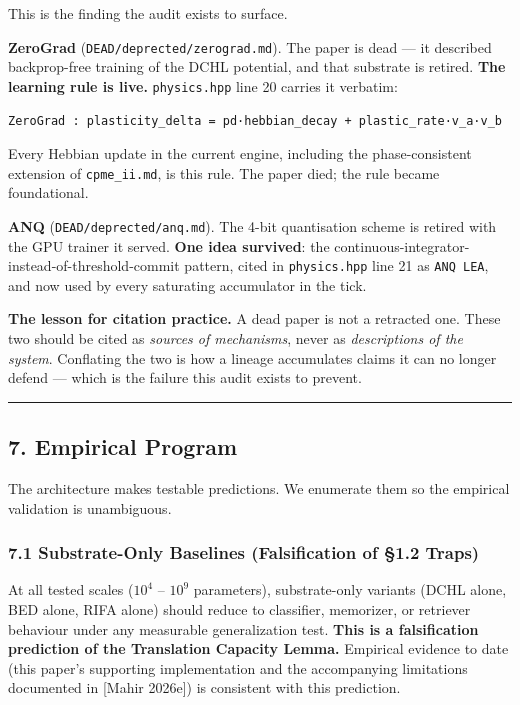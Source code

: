 \documentclass[
  11pt,
  a4paper,
]{article}
\begin{document}
This is the finding the audit exists to surface.

\textbf{ZeroGrad} (\texttt{DEAD/deprected/zerograd.md}). The paper is
dead --- it described backprop-free training of the DCHL potential, and
that substrate is retired. \textbf{The learning rule is live.}
\texttt{physics.hpp} line 20 carries it verbatim:

\begin{verbatim}
ZeroGrad : plasticity_delta = pd·hebbian_decay + plastic_rate·v_a·v_b
\end{verbatim}

Every Hebbian update in the current engine, including the
phase-consistent extension of \texttt{cpme\_ii.md}, is this rule. The
paper died; the rule became foundational.

\textbf{ANQ} (\texttt{DEAD/deprected/anq.md}). The 4-bit quantisation
scheme is retired with the GPU trainer it served. \textbf{One idea
survived}: the continuous-integrator-instead-of-threshold-commit
pattern, cited in \texttt{physics.hpp} line 21 as \texttt{ANQ\ LEA}, and
now used by every saturating accumulator in the tick.

\textbf{The lesson for citation practice.} A dead paper is not a
retracted one. These two should be cited as \emph{sources of
mechanisms}, never as \emph{descriptions of the system}. Conflating the
two is how a lineage accumulates claims it can no longer defend ---
which is the failure this audit exists to prevent.

\begin{center}\rule{0.5\linewidth}{0.5pt}\end{center}

\subsection{7. Empirical Program}\label{empirical-program}

The architecture makes testable predictions. We enumerate them so the
empirical validation is unambiguous.

\subsubsection{7.1 Substrate-Only Baselines (Falsification of §1.2
Traps)}\label{substrate-only-baselines-falsification-of-1.2-traps}

At all tested scales (\(10^4\) -- \(10^9\) parameters), substrate-only
variants (DCHL alone, BED alone, RIFA alone) should reduce to
classifier, memorizer, or retriever behaviour under any measurable
generalization test. \textbf{This is a falsification prediction of the
Translation Capacity Lemma.} Empirical evidence to date (this paper's
supporting implementation and the accompanying limitations documented in
{[}Mahir 2026e{]}) is consistent with this prediction.
\end{document}
